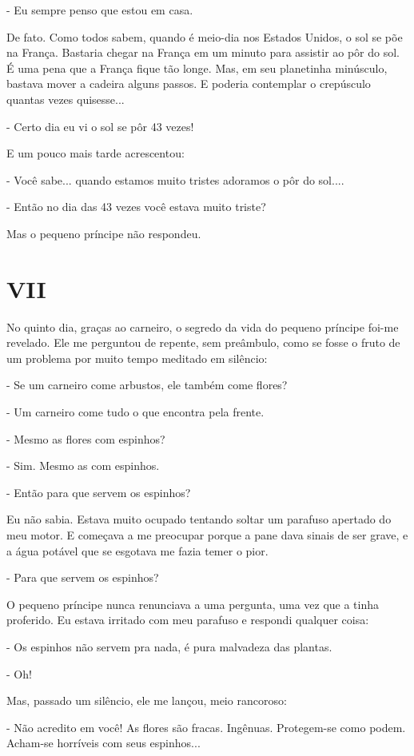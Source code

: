 - Eu sempre penso que estou em casa.

De fato. Como todos sabem, quando é meio-dia nos Estados Unidos, o sol
se põe na França. Bastaria chegar na França em um minuto para assistir
ao pôr do sol. É uma pena que a França fique tão longe. Mas, em seu
planetinha minúsculo, bastava mover a cadeira alguns passos. E poderia
contemplar o crepúsculo quantas vezes quisesse...

- Certo dia eu vi o sol se pôr 43 vezes!

E um pouco mais tarde acrescentou:

- Você sabe... quando estamos muito tristes adoramos o pôr do sol....

- Então no dia das 43 vezes você estava muito triste?

Mas o pequeno príncipe não respondeu.

\chapter{VII}

No quinto dia, graças ao carneiro, o segredo da vida do pequeno príncipe
foi-me revelado. Ele me perguntou de repente, sem preâmbulo, como se
fosse o fruto de um problema por muito tempo meditado em silêncio:

- Se um carneiro come arbustos, ele também come flores?

- Um carneiro come tudo o que encontra pela frente.

- Mesmo as flores com espinhos?

- Sim. Mesmo as com espinhos.

- Então para que servem os espinhos?

Eu não sabia. Estava muito ocupado tentando soltar um parafuso apertado
do meu motor. E começava a me preocupar porque a pane dava sinais de ser
grave, e a água potável que se esgotava me fazia temer o pior.

- Para que servem os espinhos?

O pequeno príncipe nunca renunciava a uma pergunta, uma vez que a tinha
proferido. Eu estava irritado com meu parafuso e respondi qualquer
coisa:

- Os espinhos não servem pra nada, é pura malvadeza das plantas.

- Oh!

Mas, passado um silêncio, ele me lançou, meio rancoroso:

- Não acredito em você! As flores são fracas. Ingênuas. Protegem-se como
podem. Acham-se horríveis com seus espinhos...

